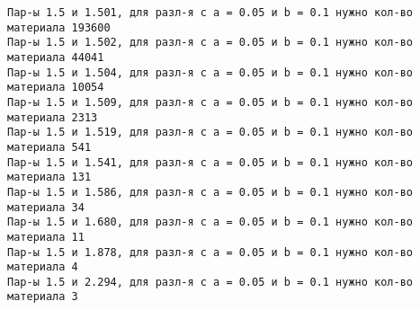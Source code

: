 \documentclass[11pt]{article}
\begin{document}
{\fontsize{9.7}{10}
    \begin{Verbatim}[commandchars=\\\{\}]
Пар-ы 1.5 и 1.501, для разл-я с a = 0.05 и b = 0.1 нужно кол-во материала 193600
Пар-ы 1.5 и 1.502, для разл-я с a = 0.05 и b = 0.1 нужно кол-во материала 44041
Пар-ы 1.5 и 1.504, для разл-я с a = 0.05 и b = 0.1 нужно кол-во материала 10054
Пар-ы 1.5 и 1.509, для разл-я с a = 0.05 и b = 0.1 нужно кол-во материала 2313
Пар-ы 1.5 и 1.519, для разл-я с a = 0.05 и b = 0.1 нужно кол-во материала 541
Пар-ы 1.5 и 1.541, для разл-я с a = 0.05 и b = 0.1 нужно кол-во материала 131
Пар-ы 1.5 и 1.586, для разл-я с a = 0.05 и b = 0.1 нужно кол-во материала 34
Пар-ы 1.5 и 1.680, для разл-я с a = 0.05 и b = 0.1 нужно кол-во материала 11
Пар-ы 1.5 и 1.878, для разл-я с a = 0.05 и b = 0.1 нужно кол-во материала 4
Пар-ы 1.5 и 2.294, для разл-я с a = 0.05 и b = 0.1 нужно кол-во материала 3
\end{Verbatim}
}


    
    
    
    
\end{document}
